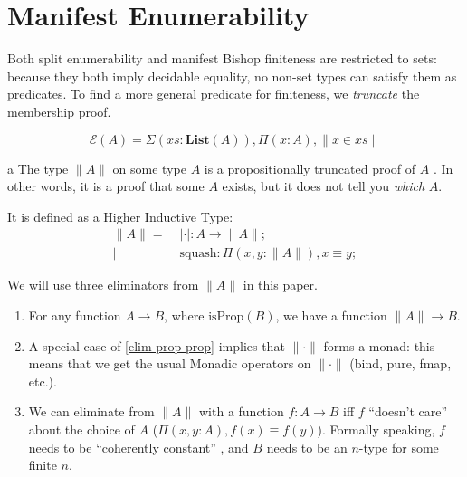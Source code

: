 \section{Manifest Enumerability} \label{manifest-enumerability}
Both split enumerability and manifest Bishop finiteness are restricted to sets:
because they both imply decidable equality, no non-set types can satisfy them as
predicates.
To find a more general predicate for finiteness, we \emph{truncate} the
membership proof.
\begin{rm-definition}
  \begin{equation}
    \mathcal{E}(A) = \Sigma {(\mathit{xs} : \mathbf{List}(A))} , \Pi {(x : A)} , \lVert x \in \mathit{xs} \rVert
  \end{equation}
\end{rm-definition}
\begin{rm-definition}a \label{prop-trunc}
  The type \(\lVert A \rVert\) on some type \(A\) is a propositionally truncated
  proof of \(A\) \cite[3.7]{hottbook}.
  In other words, it is a proof that some \(A\) exists, but it does not tell you
  \emph{which} \(A\).

  It is defined as a Higher Inductive Type:
  \begin{equation}
    \begin{aligned}
      \lVert A \rVert =& \; \lvert \cdot \rvert : A \rightarrow \lVert A \rVert ; \\
                      |& \; \text{squash} : \Pi {(x, y : \lVert A \rVert)} , x \equiv y  ; 
    \end{aligned}
  \end{equation}

  We will use three eliminators from \(\lVert A \rVert\) in this paper.
  \begin{enumerate}
  \item \label{elim-prop-prop} For any function \(A \rightarrow B\), where
    \(\text{isProp}(B)\), we have a function \(\lVert A \rVert \rightarrow B\).
  \item \label{elim-prop-monad} A special case of \ref{elim-prop-prop} implies
    that \(\lVert \cdot \rVert\) forms a monad: this means that we get the usual
    Monadic operators on \(\lVert \cdot \rVert\) (bind, pure, fmap, etc.).
    \item \label{elim-prop-coh} We can eliminate from \(\lVert A \rVert\) with a
      function \(f : A \rightarrow B\) iff \(f\) ``doesn't care'' about the
      choice of \(A\) (\(\Pi {(x , y : A)} , f(x) \equiv f(y) \)).
      Formally speaking, \(f\) needs to be ``coherently constant''
      \cite{krausGeneralUniversalProperty2015}, and \(B\) needs to be an
      \(n\)-type for some finite \(n\).
  \end{enumerate}
\end{rm-definition}

